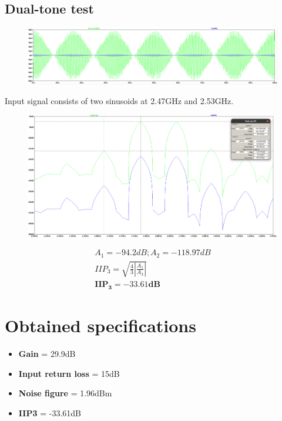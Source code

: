 \documentclass{article}
\begin{document}
\subsection*{Dual-tone test}
\begin{figure}[H]
	\includegraphics[scale=0.27]{../figs/2tone.png}
\end{figure}
Input signal consists of two sinusoids at 2.47GHz and 2.53GHz.
\begin{figure}[H]
	\includegraphics[scale=0.27]{../figs/2tone_ft.png}
\end{figure}

\begin{gather*}
	A_1 = -94.2dB; A_2 = -118.97dB\\
	IIP_3 = \sqrt{\frac{4}{3}\left|\frac{A_1}{A_3}\right|}\\
	\mathbf{IIP_3 = -33.61dB}
\end{gather*}
\section*{\hfil Obtained specifications}
\begin{itemize}
	\item \textbf{Gain} = 29.9dB
	\item \textbf{Input return loss} = 15dB
	\item  \textbf{Noise figure} = 1.96dBm
	\item \textbf{IIP3} = -33.61dB
\end{itemize}
\end{document}
